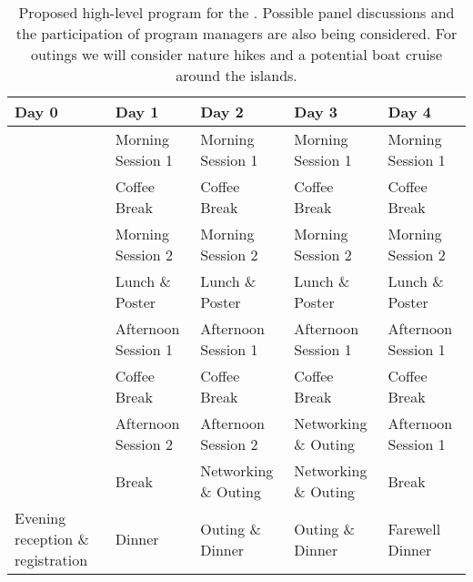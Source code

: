\begin{table}[!]
  \centering
  \footnotesize{
  \begin{tabular}{|p{2.5cm}|p{2.5cm}|p{2.5cm}|p{2.5cm}|p{2.5cm}|}
    \hline 
    \rowcolor{Gray}
    \bfseries Day 0& \bfseries Day 1&\bfseries Day 2 &\bfseries Day 3 &\bfseries Day 4\\
    \hline
                   &Morning Session 1&Morning Session 1&Morning Session 1&Morning Session 1\\
    \hline
                   &Coffee Break&Coffee Break&Coffee Break&Coffee Break\\
    \hline    
                   &Morning Session 2&Morning Session 2&Morning Session 2&Morning Session 2\\
    \hline
                   &Lunch \& Poster &Lunch \& Poster&Lunch \&
                                                      Poster&Lunch \& Poster\\
    \hline
                   &Afternoon Session 1&Afternoon Session 1&Afternoon Session 1&Afternoon Session 1\\
    \hline
                   &Coffee Break&Coffee Break&Coffee Break&Coffee Break\\
    \hline
                   &Afternoon Session 2&Afternoon Session 2&Networking \& Outing&Afternoon Session 1\\
    \hline
                   &Break&Networking \& Outing&Networking \& Outing&Break\\
    \hline
    Evening reception \& registration&Dinner&Outing \& Dinner&Outing \&
                                                               Dinner&Farewell Dinner\\
    \hline        
  \end{tabular}
  }
  \caption{Proposed high-level program for the \sympe. Possible panel
    discussions and the participation of program managers are also
    being considered. For outings we will consider nature hikes and a
    potential boat cruise around the islands.}
  \label{tab:symp}
\end{table}
